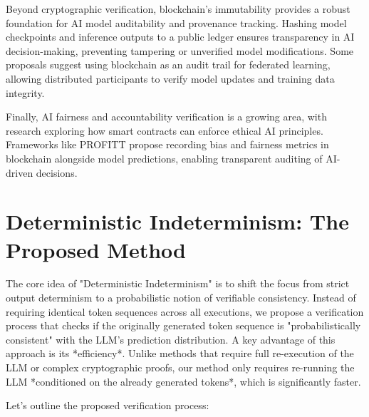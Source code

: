 \documentclass{article}
\begin{document}
Beyond cryptographic verification, blockchain’s immutability provides a robust foundation for AI model auditability and provenance tracking. Hashing model checkpoints and inference outputs to a public ledger ensures transparency in AI decision-making, preventing tampering or unverified model modifications. Some proposals suggest using blockchain as an audit trail for federated learning, allowing distributed participants to verify model updates and training data integrity.

Finally, AI fairness and accountability verification is a growing area, with research exploring how smart contracts can enforce ethical AI principles. Frameworks like PROFITT propose recording bias and fairness metrics in blockchain alongside model predictions, enabling transparent auditing of AI-driven decisions.


\section{Deterministic Indeterminism: The Proposed Method}

The core idea of "Deterministic Indeterminism" is to shift the focus from strict output determinism to a probabilistic notion of verifiable consistency.  Instead of requiring identical token sequences across all executions, we propose a verification process that checks if the originally generated token sequence is "probabilistically consistent" with the LLM's prediction distribution.  A key advantage of this approach is its *efficiency*.  Unlike methods that require full re-execution of the LLM or complex cryptographic proofs, our method only requires re-running the LLM *conditioned on the already generated tokens*, which is significantly faster.

Let's outline the proposed verification process:
\end{document}
